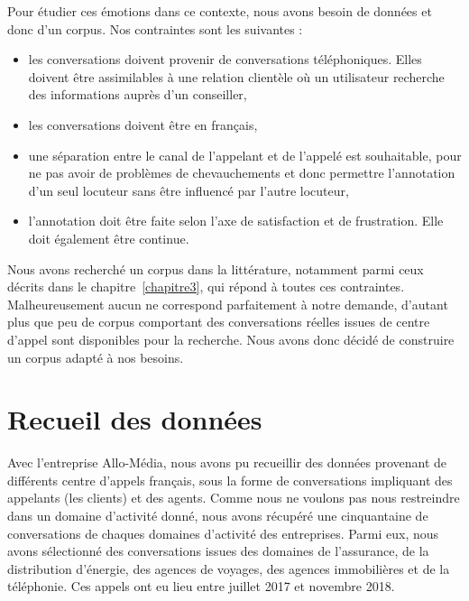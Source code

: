 

Pour étudier ces émotions dans ce contexte, nous avons besoin de données et donc d'un corpus. Nos contraintes sont les suivantes :
\begin{itemize}
  \item les conversations doivent provenir de conversations téléphoniques. Elles doivent être assimilables à une relation clientèle où un utilisateur recherche des informations auprès d'un conseiller,
  \item les conversations doivent être en français,
  \item une séparation entre le canal de l'appelant et de l'appelé est souhaitable, pour ne pas avoir de problèmes de chevauchements et donc permettre l'annotation d'un seul locuteur sans être influencé par l'autre locuteur,
  \item l'annotation doit être faite selon l'axe de satisfaction et de frustration. Elle doit également être continue.
\end{itemize}

Nous avons recherché un corpus dans la littérature, notamment parmi ceux décrits dans le chapitre~\ref{chapitre3}, qui répond à toutes ces contraintes. Malheureusement aucun ne correspond parfaitement à notre demande, d'autant plus que peu de corpus comportant des conversations réelles issues de centre d'appel sont disponibles pour la recherche. Nous avons donc décidé de construire un corpus adapté à nos besoins.

\section{Recueil des données}
Avec l'entreprise Allo-Média, nous avons pu recueillir des données provenant de différents centre d'appels français, sous la forme de conversations impliquant des appelants (les clients) et des agents. Comme nous ne voulons pas nous restreindre dans un domaine d'activité donné, nous avons récupéré une cinquantaine de conversations de chaques domaines d'activité des entreprises. Parmi eux, nous avons sélectionné des conversations issues des domaines de l'assurance, de la distribution d'énergie, des agences de voyages, des agences immobilières et de la téléphonie. Ces appels ont eu lieu entre juillet 2017 et novembre 2018.

